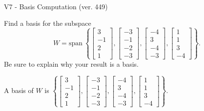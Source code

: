 \begin{exercise}
  \begin{exerciseTitle}V7 - Basis Computation (ver. 449)\end{exerciseTitle}
  \begin{exerciseStatement}
    Find a basis for the subspace 
\[W=\mathrm{span}\ \left\{\left[\begin{array}{r}
3 \\
-1 \\
2 \\
1
\end{array}\right] , \left[\begin{array}{r}
-3 \\
-1 \\
-2 \\
-3
\end{array}\right] , \left[\begin{array}{r}
-4 \\
3 \\
-4 \\
-3
\end{array}\right] , \left[\begin{array}{r}
1 \\
1 \\
3 \\
-4
\end{array}\right]\right\}.\]
 Be sure to explain why your result is a basis.


  \end{exerciseStatement}
  \begin{exerciseAnswer}
   A basis of \(W\) is  \(\left\{\left[\begin{array}{r}
3 \\
-1 \\
2 \\
1
\end{array}\right] , \left[\begin{array}{r}
-3 \\
-1 \\
-2 \\
-3
\end{array}\right] , \left[\begin{array}{r}
-4 \\
3 \\
-4 \\
-3
\end{array}\right] , \left[\begin{array}{r}
1 \\
1 \\
3 \\
-4
\end{array}\right]\right\}\).
  


  \end{exerciseAnswer}
\end{exercise}